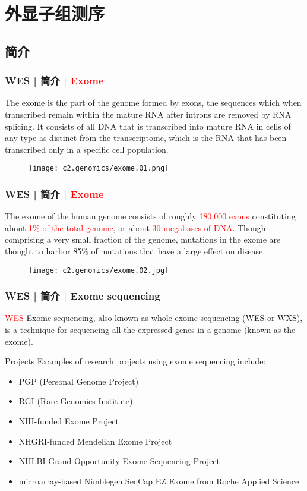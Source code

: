 \section{外显子组测序}
\subsection{简介}
\begin{frame}
  \frametitle{WES | 简介 | \textcolor{red}{Exome}}
  The exome is the part of the genome formed by exons, the sequences which when transcribed remain within the mature RNA after introns are removed by RNA splicing. It consists of all DNA that is transcribed into mature RNA in cells of any type as distinct from the transcriptome, which is the RNA that has been transcribed only in a specific cell population.
  \begin{figure}
    \centering
    \texttt{[image: c2.genomics/exome.01.png]}
  \end{figure}
\end{frame}

\begin{frame}
  \frametitle{WES | 简介 | \textcolor{red}{Exome}}
  The exome of the human genome consists of roughly \textcolor{red}{180,000 exons} constituting about \textcolor{red}{1\% of the total genome}, or about \textcolor{red}{30 megabases of DNA}. Though comprising a very small fraction of the genome, mutations in the exome are thought to harbor 85\% of mutations that have a large effect on disease.
  \begin{figure}
    \centering
    \texttt{[image: c2.genomics/exome.02.jpg]}
  \end{figure}
\end{frame}

\begin{frame}
  \frametitle{WES | 简介 | Exome sequencing}
  \begin{block}{\textcolor{red}{WES}}
  Exome sequencing, also known as whole exome sequencing (WES or WXS), is a technique for sequencing all the expressed genes in a genome (known as the exome).
  \end{block}
  \pause
  \begin{block}{Projects}
    Examples of research projects using exome sequencing include:
    \begin{itemize}
      \item PGP (Personal Genome Project)
      \item RGI (Rare Genomics Institute)
      \item NIH-funded Exome Project
      \item NHGRI-funded Mendelian Exome Project
      \item NHLBI Grand Opportunity Exome Sequencing Project
      \item microarray-based Nimblegen SeqCap EZ Exome from Roche Applied Science
    \end{itemize}
  \end{block}
\end{frame}

